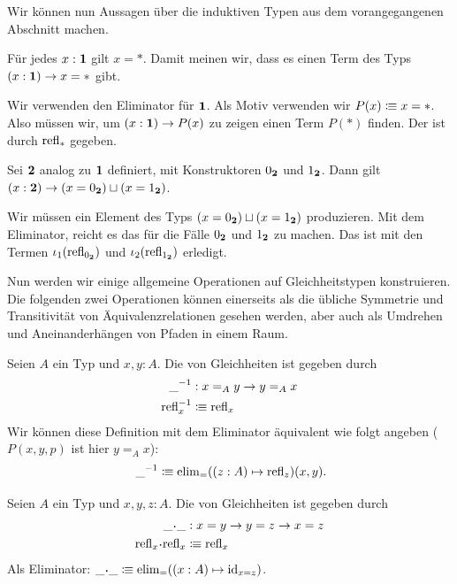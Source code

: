 Wir können nun Aussagen über die induktiven Typen aus dem vorangegangenen Abschnitt machen.
\begin{bemerkung}
  Für jedes $x:\mathbf{1}$ gilt $x=\ast$.
  Damit meinen wir, dass es einen Term des Typs $(x:\mathbf{1})\to x=\ast$ gibt.
\end{bemerkung}
\begin{beweis}
  Wir verwenden den Eliminator für $\mathbf{1}$.
  Als Motiv verwenden wir $P(x)\vcentcolon\mspace{-1.2mu}\equiv x=\ast$. Also müssen wir, um $(x:\mathbf{1})\to P(x)$ zu zeigen einen Term $P(\ast)$ finden. Der ist durch $\mathrm{refl}_\ast$ gegeben. 
\end{beweis}

\begin{bemerkung}
  Sei $\mathbf{2}$ analog zu $\mathbf{1}$ definiert, mit Konstruktoren $0_{\mathbf{2}}$ und $1_{\mathbf{2}}$.
  Dann gilt $(x:\mathbf{2})\to (x=0_{\mathbf{2}})\sqcup (x=1_{\mathbf{2}})$.
\end{bemerkung}
\begin{beweis}
  Wir müssen ein Element des Typs $(x=0_{\mathbf{2}})\sqcup (x=1_{\mathbf{2}})$ produzieren.
  Mit dem Eliminator, reicht es das für die Fälle $0_{\mathbf{2}}$ und $1_{\mathbf{2}}$ zu machen.
  Das ist mit den Termen $\iota_1(\mathrm{refl}_{0_{\mathbf{2}}})$ und $\iota_2(\mathrm{refl}_{1_{\mathbf{2}}})$ erledigt.
\end{beweis}

Nun werden wir einige allgemeine Operationen auf Gleichheitstypen konstruieren.
Die folgenden zwei Operationen können einerseits als die übliche Symmetrie und Transitivität von Äquivalenzrelationen gesehen werden, aber auch als Umdrehen und Aneinanderhängen von Pfaden in einem Raum.

\begin{definition}
  Seien $A$ ein Typ und $x,y:A$.
  Die  von Gleichheiten ist gegeben durch
  \begin{align*}
    \_^{-1} &: x=_Ay\to y=_Ax \\
    \mathrm{refl}_x^{-1}&\vcentcolon\mspace{-1.2mu}\equiv \mathrm{refl}_x 
  \end{align*}
  Wir können diese Definition mit dem Eliminator äquivalent wie folgt angeben ($P(x,y, p)$ ist hier $y=_Ax$):
  \[
     \_^{-1}\colonequiv \elim_=((z:A) \mapsto \refl_z)(x,y)\rlap{.}
  \]
\end{definition}

\begin{definition}
  Seien $A$ ein Typ und $x,y,z:A$.
  Die \index{$\_\kon\_$} von Gleichheiten ist gegeben durch
  \begin{align*}
    \_\kon\_&:x=y\to y=z\to x=z \\
    \refl_x\kon \refl_x &\colonequiv  \refl_x
  \end{align*}
  Als Eliminator: $\_\kon\_\colonequiv \elim_=((x:A)\mapsto \id_{x=z})$.
\end{definition}

